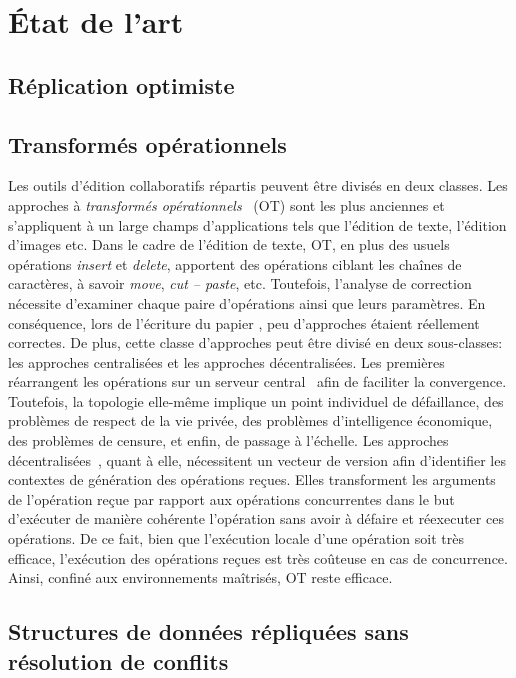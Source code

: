 
\section{État de l'art}

\subsection{Réplication optimiste}

\subsection{Transformés opérationnels}

Les outils d'édition collaboratifs répartis peuvent être divisés en deux
classes. Les approches à \emph{transformés
  opérationnels}~\cite{sun2009contextbased, sun1998operational} (OT) sont les
plus anciennes et s'appliquent à un large champs d'applications tels que
l'édition de texte, l'édition d'images etc. Dans le cadre de l'édition de texte,
OT, en plus des usuels opérations \emph{insert} et \emph{delete}, apportent des
opérations ciblant les chaînes de caractères, à savoir \emph{move}, \emph{cut --
  paste}, etc. Toutefois, l'analyse de correction nécessite d'examiner chaque
paire d'opérations ainsi que leurs paramètres. En conséquence, lors de
l'écriture du papier \cite{imine2003proving}, peu d'approches étaient réellement
correctes. De plus, cette classe d'approches peut être divisé en deux
sous-classes: les approches centralisées et les approches décentralisées. Les
premières réarrangent les opérations sur un serveur
central~\cite{nichols1995high} afin de faciliter la convergence. Toutefois, la
topologie elle-même implique un point individuel de défaillance, des problèmes
de respect de la vie privée, des problèmes d'intelligence économique, des
problèmes de censure, et enfin, de passage à l'échelle. Les approches
décentralisées~\cite{sun2009contextbased}, quant à elle, nécessitent un vecteur
de version afin d'identifier les contextes de génération des opérations
reçues. Elles transforment les arguments de l'opération reçue par rapport aux
opérations concurrentes dans le but d'exécuter de manière cohérente l'opération
sans avoir à défaire et réexecuter ces opérations. De ce fait, bien que
l'exécution locale d'une opération soit très efficace, l'exécution des
opérations reçues est très coûteuse en cas de concurrence. Ainsi, confiné aux
environnements maîtrisés, OT reste efficace.

\subsection{Structures de données répliquées sans résolution de conflits}

